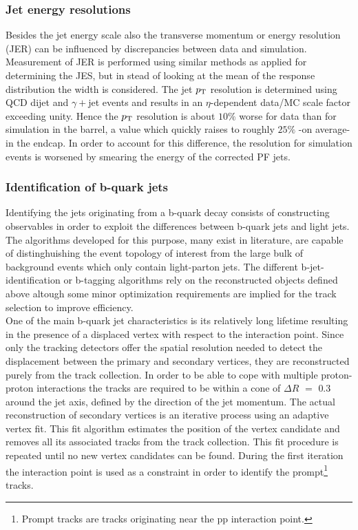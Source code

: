 \subsubsection*{Jet energy resolutions}
Besides the jet energy scale also the transverse momentum or energy resolution (JER) can be influenced by discrepancies between data and simulation. %
Measurement of JER is performed using similar methods as applied for determining the JES, but in stead of looking at the mean of the response distribution the width is considered.
The jet $p_{\rm T}$ resolution is determined using QCD dijet and $\gamma+$jet events and results in an $\eta$-dependent data/MC scale factor exceeding unity. Hence the $p_{\rm T}$ resolution is about $10 \%$ worse for data than for simulation in the barrel, a value which quickly raises to roughly $25\%$ -on average- in the endcap. In order to account for this difference, the resolution for simulation events is worsened by smearing the energy of the corrected PF jets.

\subsubsection*{Identification of b-quark jets}

Identifying the jets originating from a b-quark decay consists of constructing observables in order to exploit the differences between b-quark jets and light jets. The algorithms developed for this purpose, many exist in literature, are capable of distinghuishing the event topology of interest from the large bulk of background events which only contain light-parton jets.
The different b-jet-identification or b-tagging algorithms rely on the reconstructed objects defined above altough some minor optimization requirements are implied for the track selection to improve efficiency.
\\
One of the main b-quark jet characteristics is its relatively long lifetime resulting in the presence of a displaced vertex with respect to the interaction point. Since only the tracking detectors offer the spatial resolution needed to detect the displacement between the primary and secondary vertices, they are reconstructed purely from the track collection. In order to be able to cope with multiple proton-proton interactions the tracks are required to be within a cone of $\Delta R$ $=$ $0.3$ around the jet axis, defined by the direction of the jet momentum. 
The actual reconstruction of secondary vertices is an iterative process using an adaptive vertex fit. This fit algorithm estimates the position of the vertex candidate and removes all its associated tracks from the track collection. This fit procedure is repeated until no new vertex candidates can be found. During the first iteration the interaction point is used as a constraint in order to identify the prompt\footnote{Prompt tracks are tracks originating near the pp interaction point.} tracks.

